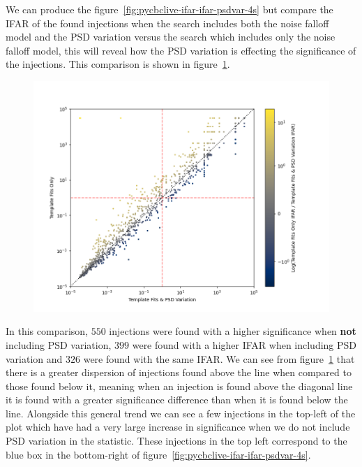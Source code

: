 We can produce the figure~\ref{fig:pycbclive-ifar-ifar-psdvar-4s} but compare the IFAR of the found injections when the search includes both the noise falloff model and the PSD variation versus the search which includes only the noise falloff model, this will reveal how the PSD variation is effecting the significance of the injections. This comparison is shown in figure~\ref{fig:pycbclive-ifar-ifar-fits-psdvar}.
%
\begin{figure}
       \centering
    \includegraphics[width=1\textwidth]{images/5_pycbclive/fits_psdvar_comparison_ifar_vs_ifar_diff.png}
    \caption{}
    \label{fig:pycbclive-ifar-ifar-fits-psdvar}
\end{figure}
%
In this comparison, $550$ injections were found with a higher significance when \textbf{not} including PSD variation, $399$ were found with a higher IFAR when including PSD variation and $326$ were found with the same IFAR. We can see from figure~\ref{fig:pycbclive-ifar-ifar-fits-psdvar} that there is a greater dispersion of injections found above the line when compared to those found below it, meaning when an injection is found above the diagonal line it is found with a greater significance difference than when it is found below the line. Alongside this general trend we can see a few injections in the top-left of the plot which have had a very large increase in significance when we do not include PSD variation in the statistic. These injections in the top left correspond to the blue box in the bottom-right of figure~\ref{fig:pycbclive-ifar-ifar-psdvar-4s}.

